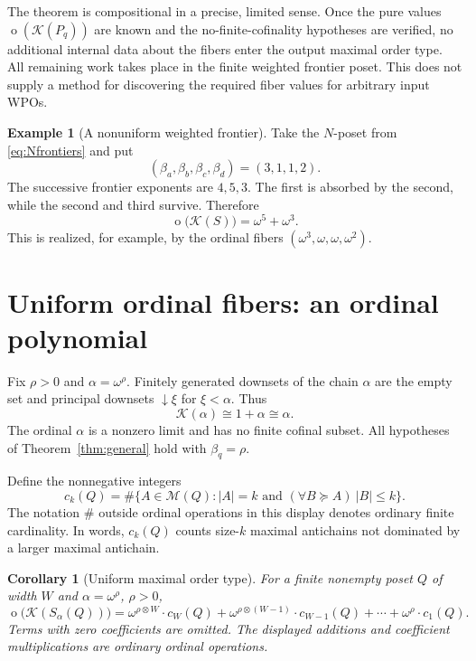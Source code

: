 \documentclass[11pt,a4paper]{article}
\newtheorem{corollary}[theorem]{Corollary}
\theoremstyle{definition}
\newtheorem{example}[theorem]{Example}
\theoremstyle{remark}
\newcommand{\K}{\mathcal K}
\newcommand{\M}{\mathcal M}
\newcommand{\ot}{\operatorname{o}}
\newcommand{\np}{\mathbin{\otimes}}
\begin{document}
The theorem is compositional in a precise, limited sense. Once the pure
values $\ot(\K(P_q))$ are known and the no-finite-cofinality hypotheses are
verified, no additional internal data about the fibers enter the output
maximal order type. All remaining work takes place in the finite weighted
frontier poset. This does not supply a method for discovering the required
fiber values for arbitrary input WPOs.

\begin{example}[A nonuniform weighted frontier]
Take the $N$-poset from \eqref{eq:Nfrontiers} and put
\[
 (\beta_a,\beta_b,\beta_c,\beta_d)=(3,1,1,2).
\]
The successive frontier exponents are $4,5,3$. The first is absorbed by
the second, while the second and third survive. Therefore
\[
 \ot\bigl(\K(S)\bigr)=\omega^5+\omega^3.
\]
This is realized, for example, by the ordinal fibers
$(\omega^3,\omega,\omega,\omega^2)$.
\end{example}

\section{Uniform ordinal fibers: an ordinal polynomial}\label{sec:uniform}

Fix $\rho>0$ and $\alpha=\omega^\rho$. Finitely generated downsets of the
chain $\alpha$ are the empty set and principal downsets $\downarrow\xi$
for $\xi<\alpha$. Thus
\begin{equation}\label{eq:ordinalK}
 \K(\alpha)\cong 1+\alpha\cong\alpha.
\end{equation}
The ordinal $\alpha$ is a nonzero limit and has no finite cofinal subset.
All hypotheses of Theorem~\ref{thm:general} hold with $\beta_q=\rho$.

Define the nonnegative integers
\begin{equation}\label{eq:ck}
 c_k(Q)=\#\{A\in\M(Q):|A|=k\text{ and }
                 (\forall B\succeq A)\ |B|\le k\}.
\end{equation}
The notation $\#$ outside ordinal operations in this display denotes
ordinary finite cardinality. In words, $c_k(Q)$ counts size-$k$ maximal
antichains not dominated by a larger maximal antichain.

\begin{corollary}[Uniform maximal order type]\label{cor:uniform}
For a finite nonempty poset $Q$ of width $W$ and $\alpha=\omega^\rho$,
$\rho>0$,
\begin{equation}\label{eq:uniform}
 \boxed{\displaystyle
 \ot\bigl(\K(S_\alpha(Q))\bigr)
   =\omega^{\rho\np W}\cdot c_W(Q)
      +\omega^{\rho\np(W-1)}\cdot c_{W-1}(Q)
      +\cdots+\omega^\rho\cdot c_1(Q).}
\end{equation}
Terms with zero coefficients are omitted. The displayed additions and
coefficient multiplications are ordinary ordinal operations.
\end{corollary}
\end{document}
